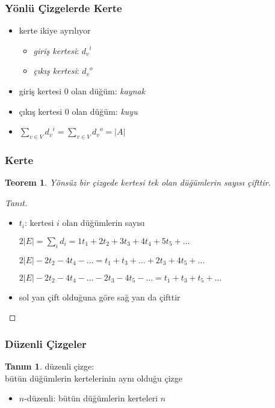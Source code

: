 \documentclass[dvipsnames]{beamer}
\theoremstyle{definition}
\newtheorem{tanim}[theorem]{Tanım}
\theoremstyle{example}
\theoremstyle{plain}
\newtheorem{teorem}[theorem]{Teorem}
\begin{document}
\begin{frame}
  \frametitle{Yönlü Çizgelerde Kerte}

  \begin{itemize}
    \item kerte ikiye ayrılıyor
    \begin{itemize}
      \item \emph{giriş kertesi}: ${d_v}^i$
      \item \emph{çıkış kertesi}: ${d_v}^o$
    \end{itemize}

    \pause
    \medskip
    \item giriş kertesi 0 olan düğüm: \emph{kaynak}
    \item çıkış kertesi 0 olan düğüm: \emph{kuyu}

    \pause
    \item $\sum_{v \in V} {d_v}^i = \sum_{v \in V} {d_v}^o = |A|$
  \end{itemize}
\end{frame}

\begin{frame}
  \frametitle{Kerte}

  \begin{teorem}
    Yönsüz bir çizgede kertesi tek olan düğümlerin sayısı çifttir.
  \end{teorem}

  \pause
  \begin{proof}[Tanıt]
    \begin{itemize}
      \item $t_i$: kertesi $i$ olan düğümlerin sayısı

      \pause
$2|E| = \sum_i d_i = 1t_1 + 2t_2 + 3t_3 + 4t_4 + 5t_5 + \dots$

\pause
$2|E| - 2t_2 - 4t_4 - \dots = t_1 + t_3 + \dots + 2t_3 + 4t_5 + \dots$

\pause
$2|E| - 2t_2 - 4t_4 - \dots - 2t_3 - 4t_5 - \dots = t_1 + t_3 + t_5 + \dots$

      \pause
      \item sol yan çift olduğuna göre sağ yan da çifttir
    \end{itemize}
  \end{proof}
\end{frame}

\begin{frame}
  \frametitle{Düzenli Çizgeler}

  \begin{tanim}
    \alert{düzenli çizge}:\\
    bütün düğümlerin kertelerinin aynı olduğu çizge

    \begin{itemize}
      \item $n$-düzenli: bütün düğümlerin kerteleri $n$
    \end{itemize}
  \end{tanim}
\end{frame}
\end{document}

